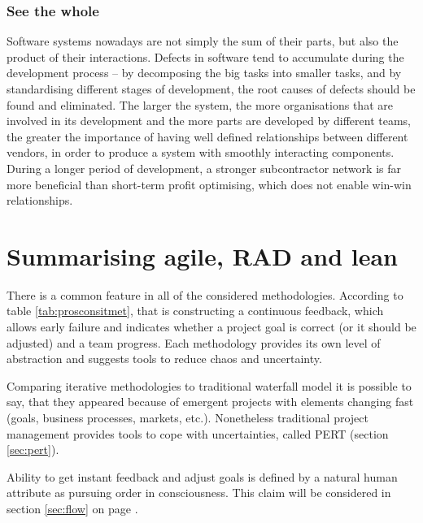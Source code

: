 \subsubsection{See the whole}

Software systems nowadays are not simply the sum of their parts, but also the product of their interactions. Defects in software tend to accumulate during the development process -- by decomposing the big tasks into smaller tasks, and by standardising different stages of development, the root causes of defects should be found and eliminated. The larger the system, the more organisations that are involved in its development and the more parts are developed by different teams, the greater the importance of having well defined relationships between different vendors, in order to produce a system with smoothly interacting components. During a longer period of development, a stronger subcontractor network is far more beneficial than short-term profit optimising, which does not enable win-win relationships.

\section{Summarising agile, RAD and lean}

There is a common feature in all of the considered methodologies. According to table \ref{tab:prosconsitmet}, that is constructing a continuous feedback, which allows early failure and indicates whether a project goal is correct (or it should be adjusted) and a team progress. Each methodology provides its own level of abstraction and suggests tools to reduce chaos and uncertainty.

Comparing iterative methodologies to traditional waterfall model it is possible to say, that they appeared because of emergent projects with elements changing fast (goals, business processes, markets, etc.). Nonetheless traditional project management provides tools to cope with uncertainties, called PERT (section \ref{sec:pert}).

Ability to get instant feedback and adjust goals is defined by a natural human attribute as pursuing order in consciousness. This claim will be considered in section \ref{sec:flow} on page \pageref{sec:flow}.

